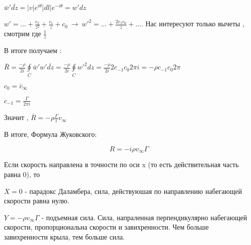 $\bar{w}' \bar{dz} = |v| e^{i \theta} |dl| e^{-i \theta} = w' dz$

$w' = ... + \frac{c_2}{z^2} + \frac{c_1}{z} + c_0 \ \rightarrow \ w'^2 = ... + \frac{2 c_1 c_0}{z} + ...$. Нас интересуют только вычеты , смотрим где $\frac{1}{z}$ 

В итоге получаем : 

$\bar{R} =  \frac{-\rho}{2 i} \oint \limits_{C} \bar{w}'  w'  \bar{d z} =  \frac{-\rho}{2 i} \oint \limits_{C} w'^2 dz =   \frac{-\rho}{2 i} 2 c_{-1} c_0 2 \pi i = -\rho c_{-1} c_0 2 \pi$

$ c_0 = \bar{v}_{\infty}$

$c_{-1} = \frac{\Gamma}{2 \pi i} $

Значит , $\bar{R} = -\rho \frac{\Gamma}{i} v_{\infty} $ 

В итоге, Формула Жуковского: 

$$
R = -i \rho v_{\infty} \Gamma
$$

Если скорость направлена в точности по оси x (то есть действительная часть равна 0), то 

$X = 0$ - парадокс Даламбера, сила, действуюшая по направлению набегающей скорости равна нулю.

$Y = -\rho v_{\infty} \Gamma $ - подъемная сила. Сила, напраленная перпендикулярно набегающей скорости, пропорциональна скорости и завихренности. Чем больше завихренности крыла, тем больше сила. 
